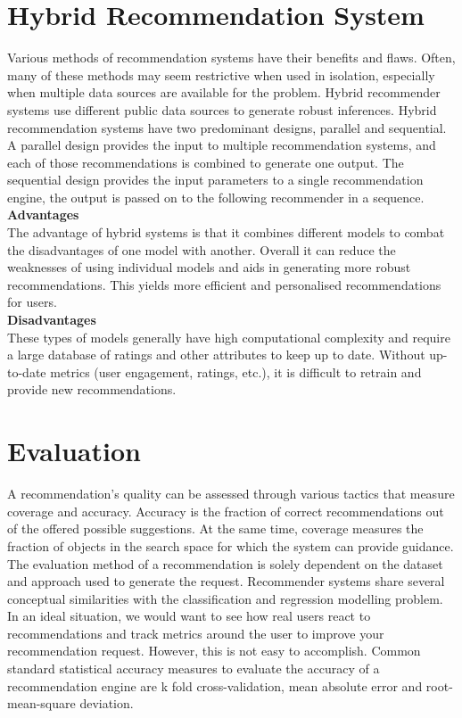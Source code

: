 \section{Hybrid Recommendation System}
Various methods of recommendation systems have their benefits and flaws. Often, many of these methods may seem restrictive when used in isolation, especially when multiple data sources are available for the problem. Hybrid recommender systems use different public data sources to generate robust inferences. Hybrid recommendation systems have two predominant designs, parallel and sequential. A parallel design provides the input to multiple recommendation systems, and each of those recommendations is combined to generate one output. 
The sequential design provides the input parameters to a single recommendation engine, the output is passed on to the following recommender in a sequence.
\\\textbf{Advantages}
\\The advantage of hybrid systems is that it combines different models to combat the disadvantages of one model with another. Overall it can reduce the weaknesses of using individual models and aids in generating more robust recommendations. This yields more efficient and personalised recommendations for users.
\\\textbf{Disadvantages} 
\\These types of models generally have high computational complexity and require a large database of ratings and other attributes to keep up to date. Without up-to-date metrics (user engagement, ratings, etc.), it is difficult to retrain and provide new recommendations.

\section{Evaluation}
A recommendation's quality can be assessed through various tactics that measure coverage and accuracy. Accuracy is the fraction of correct recommendations out of the offered possible suggestions. At the same time, coverage measures the fraction of objects in the search space for which the system can provide guidance. 
The evaluation method of a recommendation is solely dependent on the dataset and approach used to generate the request. 
Recommender systems share several conceptual similarities with the classification and regression modelling problem. 
In an ideal situation, we would want to see how real users react to recommendations and track metrics around the user to improve your recommendation request. However, this is not easy to accomplish. 
Common standard statistical accuracy measures to evaluate the accuracy of a recommendation engine are k fold cross-validation, mean absolute error and root-mean-square deviation. 
